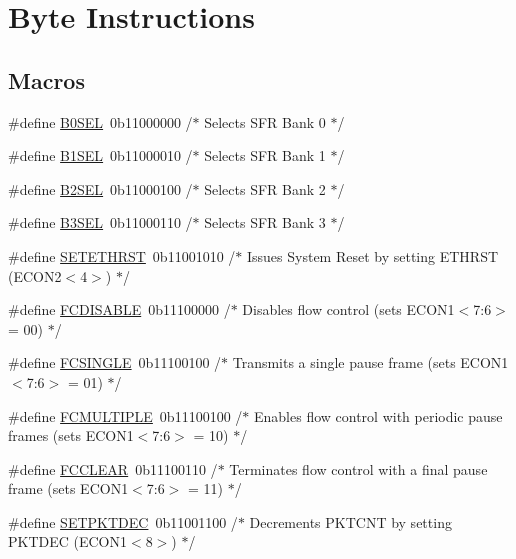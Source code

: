 \hypertarget{group___single}{}\section{Byte Instructions}
\label{group___single}
\subsection*{Macros}
\begin{DoxyCompactItemize}
\item 
\#define \mbox{\hyperlink{group___single_ga6239793585f937e37e61eda071508b40}{B0\+S\+EL}}~0b11000000 /$\ast$ Selects S\+F\+R Bank 0 $\ast$/
\item 
\#define \mbox{\hyperlink{group___single_gab360ee4ad696c1bdd05618a6fb93747b}{B1\+S\+EL}}~0b11000010 /$\ast$ Selects S\+F\+R Bank 1 $\ast$/
\item 
\#define \mbox{\hyperlink{group___single_ga0c5d34eed61b9f41eb229d1296553fa3}{B2\+S\+EL}}~0b11000100 /$\ast$ Selects S\+F\+R Bank 2 $\ast$/
\item 
\#define \mbox{\hyperlink{group___single_ga3f5b541c613dad477a8d90e10a7b8a55}{B3\+S\+EL}}~0b11000110 /$\ast$ Selects S\+F\+R Bank 3 $\ast$/
\item 
\#define \mbox{\hyperlink{group___single_ga8763648ea939c9f6494cca43828dcc0c}{S\+E\+T\+E\+T\+H\+R\+ST}}~0b11001010 /$\ast$ Issues System Reset by setting E\+T\+H\+R\+S\+T (\+E\+C\+O\+N2$<$4$>$) $\ast$/
\item 
\#define \mbox{\hyperlink{group___single_ga1acab7510b4236c7e4376439a8ffe154}{F\+C\+D\+I\+S\+A\+B\+LE}}~0b11100000 /$\ast$ Disables flow control (sets E\+C\+O\+N1$<$7\+:6$>$ = 00) $\ast$/
\item 
\#define \mbox{\hyperlink{group___single_ga2d69e97099b83953d2e87b73f1b892cd}{F\+C\+S\+I\+N\+G\+LE}}~0b11100100 /$\ast$ Transmits a single pause frame (sets E\+C\+O\+N1$<$7\+:6$>$ = 01) $\ast$/
\item 
\#define \mbox{\hyperlink{group___single_gac545b2d639c3967af4c1150334952fb4}{F\+C\+M\+U\+L\+T\+I\+P\+LE}}~0b11100100 /$\ast$ Enables flow control with periodic pause frames (sets E\+C\+O\+N1$<$7\+:6$>$ = 10) $\ast$/
\item 
\#define \mbox{\hyperlink{group___single_ga9d7f9a8ede2963dbd00699d9244fd18a}{F\+C\+C\+L\+E\+AR}}~0b11100110 /$\ast$ Terminates flow control with a final pause frame (sets E\+C\+O\+N1$<$7\+:6$>$ = 11) $\ast$/
\item 
\#define \mbox{\hyperlink{group___single_gab4cdb8940073f2025cab184a4215510f}{S\+E\+T\+P\+K\+T\+D\+EC}}~0b11001100 /$\ast$ Decrements P\+K\+T\+C\+N\+T by setting P\+K\+T\+D\+E\+C (\+E\+C\+O\+N1$<$8$>$) $\ast$/

\end{DoxyCompactItemize}
